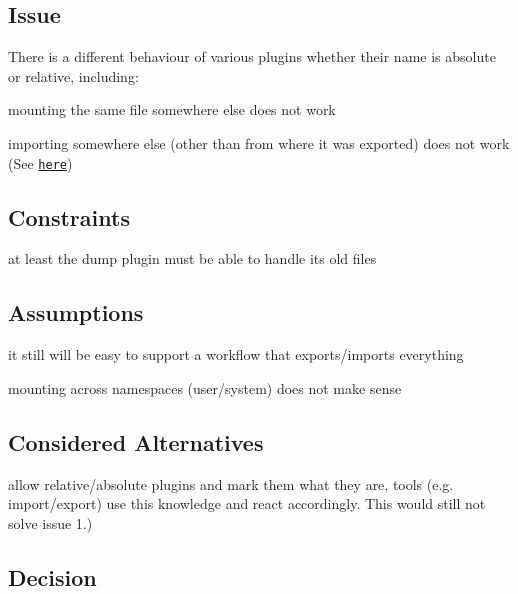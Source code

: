 \subsection*{Issue}

There is a different behaviour of various plugins whether their name is absolute or relative, including\+:


\begin{DoxyEnumerate}
\item mounting the same file somewhere else does not work
\item importing somewhere else (other than from where it was exported) does not work (See \href{https://github.com/ElektraInitiative/libelektra/issues/51}{\tt here})
\end{DoxyEnumerate}

\subsection*{Constraints}


\begin{DoxyItemize}
\item at least the dump plugin must be able to handle its old files
\end{DoxyItemize}

\subsection*{Assumptions}


\begin{DoxyItemize}
\item it still will be easy to support a workflow that exports/imports everything
\item mounting across namespaces (user/system) does not make sense
\end{DoxyItemize}

\subsection*{Considered Alternatives}


\begin{DoxyItemize}
\item allow relative/absolute plugins and mark them what they are, tools (e.\+g. import/export) use this knowledge and react accordingly. This would still not solve issue 1.)
\end{DoxyItemize}

\subsection*{Decision}

